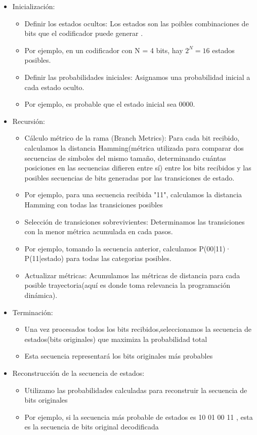 \documentclass[11pt,openany]{book}
\begin{document}
\begin{itemize}
      \item Inicialización:
      \begin{itemize}
            \item Definir los estados ocultos: Los estados son las poibles combinaciones de bits que el codificador puede generar .
            \item Por ejemplo, en un codificador con N = 4 bits, hay $2^{N}= 16 $ estados posibles.
            \item Definir las probabilidades iniciales: Asignamos una probabilidad inicial a cada estado oculto.
            \item Por ejemplo, es probable que el estado inicial sea 0000.
      \end{itemize}

      \item Recursión:
      \begin{itemize}
            \item Cálculo métrico de la rama (Branch Metrics): Para cada bit recibido, calculamos la distancia Hamming(métrica utilizada para comparar dos secuencias
            de simboles del mismo tamaño, determinando cuántas posiciones en las secuencias difieren entre sí) entre los bits recibidos 
            y las posibles secuencias de bits generadas por las transiciones de estado.
            \item Por ejemplo, para una secuencia recibida "11", calculamos la distancia Hamming con todas las transiciones posibles
            \item Selección de transiciones sobrevivientes: Determinamos las transiciones con la menor métrica acumulada en cada pasos.
            \item Por ejemplo, tomando la secuencia anterior, calculamos P(00|11)· P(11|estado) para todas las categorias posibles.
            \item Actualizar métricas: Acumulamos las métricas de distancia para cada posible trayectoria(aquí es donde toma relevancia la programación dinámica).
      \end{itemize}

      \item Terminación:
      \begin{itemize}
            \item Una vez procesados todos los bits recibidos,seleccionamos la secuencia de estados(bits originales) que maximiza la probabilidad total
            \item Esta secuencia representará los bits originales más probables
      \end{itemize}
      \item Reconstrucción de la secuencia de estados:
      \begin{itemize}
            \item Utilizamo las probabilidades calculadas para reconstruir la secuencia  de bits originales
            \item Por ejemplo, si la secuencia más probable de estados es 10 01 00 11 , esta es la secuencia de bits original decodificada
      \end{itemize}
\end{itemize}
\end{document}
